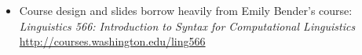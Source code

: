 \documentclass[a4paper,landscape,headrule,footrule]{foils}
\begin{document}

\begin{itemize}
\item Course design and slides borrow heavily from Emily Bender's course:
\textit{Linguistics 566: Introduction to Syntax for Computational Linguistics}
\\ \url{http://courses.washington.edu/ling566}
\end{itemize}


%
\end{document}
